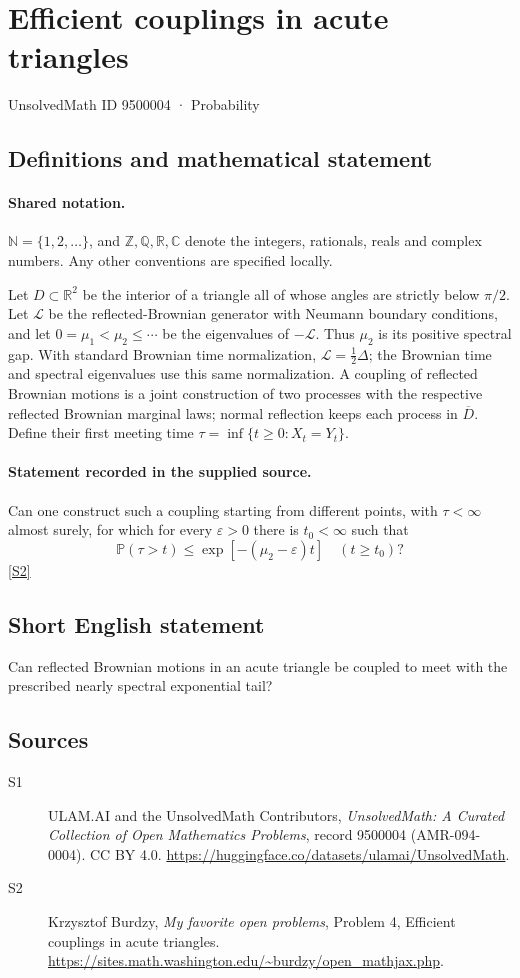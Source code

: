 \documentclass[11pt]{article}
\newcommand{\sref}[2]{\hyperlink{source:#1:#2}{[S#2]}}
\begin{document}
\setcounter{section}{9500003}
\section{Efficient couplings in acute triangles}\label{9500004}
{\small\sffamily UnsolvedMath ID 9500004 · Probability}
\subsection{Definitions and mathematical statement}

\paragraph{Shared notation.}$\mathbb N=\{1,2,\ldots\}$, and $\mathbb Z,\mathbb Q,\mathbb R,\mathbb C$ denote the integers, rationals, reals and complex numbers. Any other conventions are specified locally.


Let $D\subset\mathbb R^2$ be the interior of a triangle all of whose angles are strictly below $\pi/2$. Let $\mathcal L$ be the reflected-Brownian generator with Neumann boundary conditions, and let $0=\mu_1<\mu_2\le\cdots$ be the eigenvalues of $-\mathcal L$. Thus $\mu_2$ is its positive spectral gap. With standard Brownian time normalization, $\mathcal L=\tfrac12\Delta$; the Brownian time and spectral eigenvalues use this same normalization. A coupling of reflected Brownian motions is a joint construction of two processes with the respective reflected Brownian marginal laws; normal reflection keeps each process in $\overline D$. Define their first meeting time $\tau=\inf\{t\ge0:X_t=Y_t\}$.
\paragraph{Statement recorded in the supplied source.}
Can one construct such a coupling starting from different points, with $\tau<\infty$ almost surely, for which for every $\varepsilon>0$ there is $t_0<\infty$ such that
\[\mathbb P(\tau>t)\le\exp[-(\mu_2-\varepsilon)t]\quad(t\ge t_0)?\] \sref{9500004}{2}
\subsection{Short English statement}
Can reflected Brownian motions in an acute triangle be coupled to meet with the prescribed nearly spectral exponential tail?
\subsection{Sources}
\begin{description}
\item[\hypertarget{source:9500004:1}{S1}] ULAM.AI and the UnsolvedMath Contributors, \emph{UnsolvedMath: A Curated Collection of Open Mathematics Problems}, record 9500004 (AMR-094-0004). CC BY 4.0. \url{https://huggingface.co/datasets/ulamai/UnsolvedMath}.
\item[\hypertarget{source:9500004:2}{S2}] Krzysztof Burdzy, \emph{My favorite open problems}, Problem 4, Efficient couplings in acute triangles. \url{https://sites.math.washington.edu/~burdzy/open_mathjax.php}.
\end{description}
\label{end:9500004}
\end{document}
